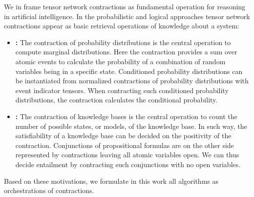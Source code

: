 
We in  frame tensor network contractions as fundamental operation for reasoning in artificial intelligence.
In the probabilistic and logical approaches tensor network contractions appear as basic retrieval operations of knowledge about a system:
\begin{itemize}
    \item \textbf{\ProbabilityTheory{}:}
    The contraction of probability distributions is the central operation to compute marginal distributions.
    Here the contraction provides a sum over atomic events to calculate the probability of a combination of random variables being in a specific state.
    Conditioned probability distributions can be instantiated from normalized contractions of probability distributions with event indicator tensors.
    When contracting such conditioned probability distributions, the contraction calculates the conditional probability.
    \item \textbf{\PropositionalLogic{}:}
    The contraction of knowledge bases is the central operation to count the number of possible states, or models, of the knowledge base.
    In such way, the satisfiability of a knowledge base can be decided on the positivity of the contraction.
    Conjunctions of propositional formulas are on the other side represented by contractions leaving all atomic variables open.
    We can thus decide entailment by contracting such conjunctions with no open variables.
\end{itemize}
Based on these motivations, we formulate in this work all algorithms as orchestrations of contractions.


